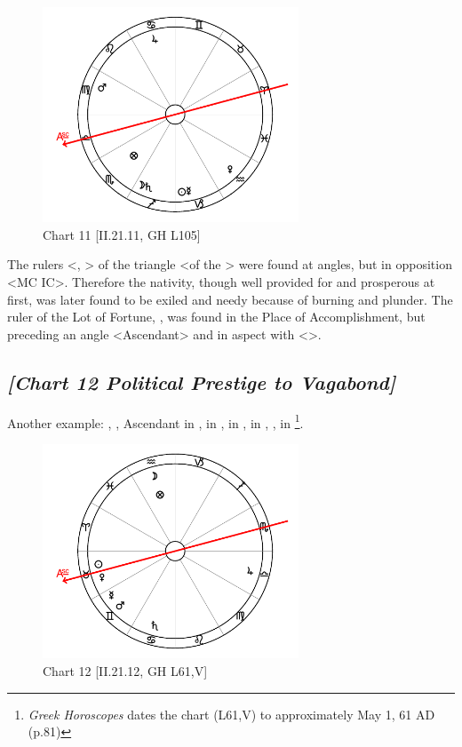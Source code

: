 \clearpage
\begin{figure}
\centering
\vspace{-20pt}
\includegraphics[width=0.68\textwidth]{charts/2_21_11}
\caption{Chart 11 [II.21.11, GH L105]}
\label{fig:chart11}
\end{figure}

The rulers <\Jupiter, \Sun> of the triangle <of the \Sun> were found at angles, but in opposition <MC IC>. Therefore the nativity, though well provided for and prosperous at first, was later found to be exiled and needy because of burning and plunder. The ruler of the Lot of Fortune, \Mars, was found in the Place of Accomplishment, but preceding an angle <Ascendant> and in aspect with \Saturn <\Square>.

\newpage
\subsection*{\textit{[Chart 12 Political Prestige to Vagabond]}}

Another example: \Sun, \Venus, Ascendant in \Taurus, \Moon\xspace in \Aquarius, \Saturn\xspace in \Cancer, \Jupiter\xspace in \Libra, \Mars, \Mercury\xspace in \Gemini
\footnote{\textit{Greek Horoscopes} dates the chart (L61,V) to approximately May 1, 61 AD (p.81)}.

\clearpage
\begin{figure}
\centering
\vspace{-20pt}
\includegraphics[width=0.68\textwidth]{charts/2_21_12}
\caption{Chart 12 [II.21.12, GH L61,V]}
\label{fig:chart12}
\end{figure}

